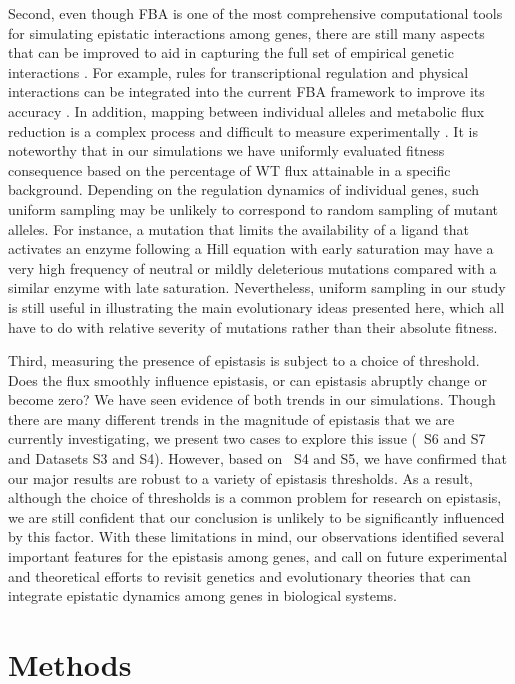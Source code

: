 Second, even though FBA is one of the most comprehensive computational
tools for simulating epistatic interactions among genes, there are
still many aspects that can be improved to aid in capturing the full
set of empirical genetic interactions \citep{Covert2001}. For example, rules for
transcriptional regulation and physical interactions can be integrated
into the current FBA framework to improve its accuracy \citep{Szappanos2011}. In
addition, mapping between individual alleles and metabolic flux
reduction is a complex process and difficult to measure experimentally
\citep{Banta2007}. It is noteworthy that in our simulations we have uniformly
evaluated fitness consequence based on the percentage of WT flux
attainable in a specific background. Depending on the regulation
dynamics of individual genes, such uniform sampling may be unlikely to
correspond to random sampling of mutant alleles. For instance, a
mutation that limits the availability of a ligand that activates an
enzyme following a Hill equation with early saturation may have a very
high frequency of neutral or mildly deleterious mutations compared
with a similar enzyme with late saturation. Nevertheless, uniform
sampling in our study is still useful in illustrating the main
evolutionary ideas presented here, which all have to do with relative
severity of mutations rather than their absolute fitness.

Third, measuring the presence of epistasis is subject to a choice of
threshold. Does the flux smoothly influence epistasis, or can
epistasis abruptly change or become zero? We have seen evidence of
both trends in our simulations. Though there are many different trends
in the magnitude of epistasis that we are currently investigating, we
present two cases to explore this issue (\Fig~S6 and S7 and Datasets
S3 and S4). However, based on \Fig~S4 and S5, we have confirmed that
our major results are robust to a variety of epistasis thresholds. As
a result, although the choice of thresholds is a common problem for
research on epistasis, we are still confident that our conclusion is
unlikely to be significantly influenced by this factor. With these
limitations in mind, our observations identified several important
features for the epistasis among genes, and call on future
experimental and theoretical efforts to revisit genetics and
evolutionary theories that can integrate epistatic dynamics among
genes in biological systems.

\section{Methods}
